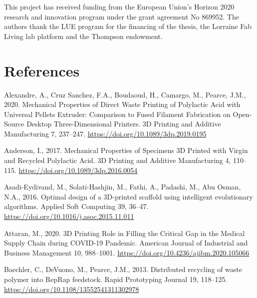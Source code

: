 \documentclass[
  12pt,
]{article}
\newlength{\cslhangindent}
\newlength{\cslentryspacingunit} %
\newenvironment{CSLReferences}[2] %
 {%
  \setlength{\parindent}{0pt}
  \ifodd #1
  \let\oldpar\par
  \def\par{\hangindent=\cslhangindent\oldpar}
  \fi
  \setlength{\parskip}{#2\cslentryspacingunit}
 }%
 {}
\begin{document}
This project has received funding from the European Union's Horizon 2020
research and innovation program under the grant agreement No 869952. The
authors thank the LUE program for the financing of the thesis, the
Lorraine Fab Living lab platform and the Thompson endowment.

\newpage

\hypertarget{references}{%
\section*{References}\label{references}}


\hypertarget{refs}{}
\begin{CSLReferences}{1}{0}
\leavevmode{}%
Alexandre, A., Cruz Sanchez, F.A., Boudaoud, H., Camargo, M., Pearce,
J.M., 2020. Mechanical {Properties} of {Direct Waste Printing} of
{Polylactic Acid} with {Universal Pellets Extruder}: {Comparison} to
{Fused Filament Fabrication} on {Open-Source Desktop Three-Dimensional
Printers}. 3D Printing and Additive Manufacturing 7, 237--247.
\url{https://doi.org/10.1089/3dp.2019.0195}

\leavevmode{}%
Anderson, I., 2017. Mechanical {Properties} of {Specimens 3D Printed}
with {Virgin} and {Recycled Polylactic Acid}. 3D Printing and Additive
Manufacturing 4, 110--115. \url{https://doi.org/10.1089/3dp.2016.0054}

\leavevmode{}%
Asadi-Eydivand, M., Solati-Hashjin, M., Fathi, A., Padashi, M., Abu
Osman, N.A., 2016. Optimal design of a {3D-printed} scaffold using
intelligent evolutionary algorithms. Applied Soft Computing 39, 36--47.
\url{https://doi.org/10.1016/j.asoc.2015.11.011}

\leavevmode{}%
Attaran, M., 2020. {3D Printing Role} in {Filling} the {Critical Gap} in
the {Medical Supply Chain} during {COVID-19 Pandemic}. American Journal
of Industrial and Business Management 10, 988--1001.
\url{https://doi.org/10.4236/ajibm.2020.105066}

\leavevmode{}%
Baechler, C., DeVuono, M., Pearce, J.M., 2013. Distributed recycling of
waste polymer into {RepRap} feedstock. Rapid Prototyping Journal 19,
118--125. \url{https://doi.org/10.1108/13552541311302978}


\end{CSLReferences}
\end{document}
